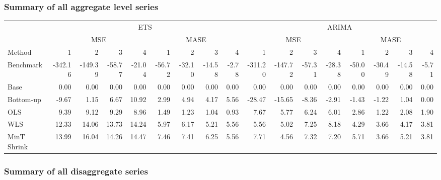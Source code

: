 \documentclass[]{article}
\begin{document}
\subsubsection{Summary of all aggregate level
series}\label{summary-of-all-aggregate-level-series}

\begin{table}[H]
\centering
\begin{tabular}{l|r|r|r|r|r|r|r|r|r|r|r|r|r|r|r|r}
\hline
\multicolumn{1}{c|}{ } & \multicolumn{8}{|c|}{ETS} & \multicolumn{8}{|c}{ARIMA} \\
\cline{2-9} \cline{10-17}
\multicolumn{1}{c|}{ } & \multicolumn{4}{|c|}{MSE} & \multicolumn{4}{|c|}{MASE} & \multicolumn{4}{|c|}{MSE} & \multicolumn{4}{|c}{MASE} \\
\cline{2-5} \cline{6-9} \cline{10-13} \cline{14-17}
Method & 1 & 2 & 3 & 4 & 1 & 2 & 3 & 4 & 1 & 2 & 3 & 4 & 1 & 2 & 3 & 4\\
\hline
Benchmark & -342.16 & -149.39 & -58.77 & -21.04 & -56.72 & -32.10 & -14.58 & -2.78 & -311.20 & -147.72 & -57.31 & -28.38 & -50.00 & -30.49 & -14.58 & -5.71\\
\hline
Base & 0.00 & 0.00 & 0.00 & 0.00 & 0.00 & 0.00 & 0.00 & 0.00 & 0.00 & 0.00 & 0.00 & 0.00 & 0.00 & 0.00 & 0.00 & 0.00\\
\hline
Bottom-up & -9.67 & 1.15 & 6.67 & 10.92 & 2.99 & 4.94 & 4.17 & 5.56 & -28.47 & -15.65 & -8.36 & -2.91 & -1.43 & -1.22 & 1.04 & 0.00\\
\hline
OLS & 9.39 & 9.12 & 9.29 & 8.96 & 1.49 & 1.23 & 1.04 & 0.93 & 7.67 & 5.77 & 6.24 & 6.01 & 2.86 & 1.22 & 2.08 & 1.90\\
\hline
WLS & 12.33 & 14.06 & 13.73 & 14.24 & 5.97 & 6.17 & 5.21 & 5.56 & 5.56 & 5.02 & 7.25 & 8.18 & 4.29 & 3.66 & 4.17 & 3.81\\
\hline
MinT Shrink & 13.99 & 16.04 & 14.26 & 14.47 & 7.46 & 7.41 & 6.25 & 5.56 & 7.71 & 4.56 & 7.32 & 7.20 & 5.71 & 3.66 & 5.21 & 3.81\\
\hline
\end{tabular}
\end{table}

\subsubsection{Summary of all disaggregate
series}\label{summary-of-all-disaggregate-series}
\end{document}
